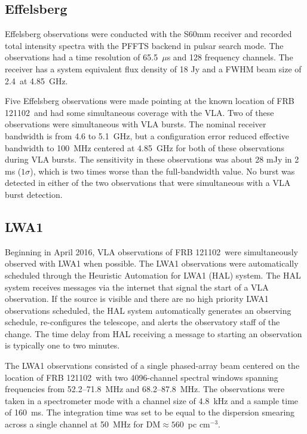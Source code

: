 \documentclass[twocolumn]{aastex61}
\newcommand{\frb}{FRB 121102}
\begin{document}
\subsection{Effelsberg}

Effelsberg observations were conducted with the S60mm receiver and recorded total intensity spectra with the PFFTS backend in pulsar search mode. The observations had a time resolution of 65.5~$\mu$s and 128 frequency channels. The receiver has a system equivalent flux density of 18 Jy and a FWHM beam size of 2.4\arcmin\ at 4.85~GHz. 

Five Effelsberg observations were made pointing at the known location of \frb\ and had some simultaneous coverage with the VLA. Two of these observations were simultaneous with VLA bursts. The nominal receiver bandwidth is from 4.6 to 5.1~GHz, but a configuration error reduced effective bandwidth to 100~MHz centered at 4.85~GHz for both of these observations during VLA bursts. The sensitivity in these observations was about 28 mJy in 2 ms ($1\sigma$), which is two times worse than the full-bandwidth value. No burst was detected in either of the two observations that were simultaneous with a VLA burst detection.

\subsection{LWA1}

Beginning in April 2016, VLA observations of \frb\ were simultaneously observed with LWA1 when possible.  The LWA1 observations were automatically scheduled through the Heuristic Automation for LWA1 (HAL) system.  The HAL system receives messages via the internet that signal the start of a VLA observation. If the source is visible and there are no high priority LWA1 observations scheduled, the HAL system automatically generates an observing schedule, re-configures the telescope, and alerts the observatory staff of the change. The time delay from HAL receiving a message to starting an observation is typically one to two minutes.

The LWA1 observations consisted of a single phased-array beam centered on the location of \frb\ with two 4096-channel spectral windows spanning frequencies from 52.2--71.8~MHz and 68.2--87.8~MHz. The observations were taken in a spectrometer mode with a channel size of 4.8~kHz and a sample time of 160~ms. The integration time was set to be equal to the dispersion smearing across a single channel at 50~MHz for DM$\approx560$\ pc cm$^{-3}$. 
\end{document}
